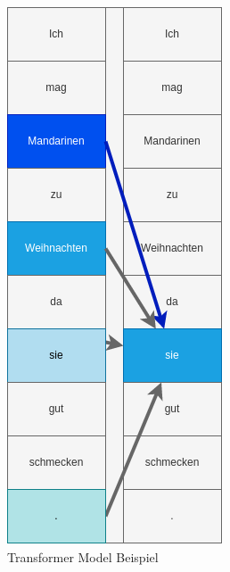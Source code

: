\documentclass[twocolumn,10pt]{article}
\begin{document}
	\begin{figure}[H]
		\includegraphics[width=.95\linewidth]{model}
		\caption{Transformer Model Beispiel}
	\end{figure}
	
\end{document}
